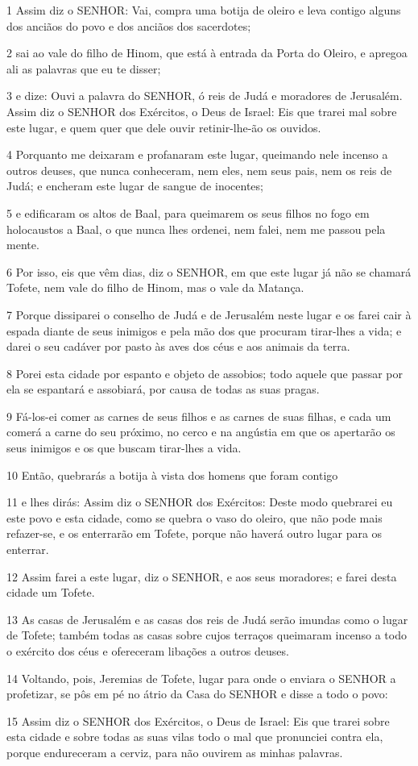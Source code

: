 \par 1 Assim diz o SENHOR: Vai, compra uma botija de oleiro e leva contigo alguns dos anciãos do povo e dos anciãos dos sacerdotes;
\par 2 sai ao vale do filho de Hinom, que está à entrada da Porta do Oleiro, e apregoa ali as palavras que eu te disser;
\par 3 e dize: Ouvi a palavra do SENHOR, ó reis de Judá e moradores de Jerusalém. Assim diz o SENHOR dos Exércitos, o Deus de Israel: Eis que trarei mal sobre este lugar, e quem quer que dele ouvir retinir-lhe-ão os ouvidos.
\par 4 Porquanto me deixaram e profanaram este lugar, queimando nele incenso a outros deuses, que nunca conheceram, nem eles, nem seus pais, nem os reis de Judá; e encheram este lugar de sangue de inocentes;
\par 5 e edificaram os altos de Baal, para queimarem os seus filhos no fogo em holocaustos a Baal, o que nunca lhes ordenei, nem falei, nem me passou pela mente.
\par 6 Por isso, eis que vêm dias, diz o SENHOR, em que este lugar já não se chamará Tofete, nem vale do filho de Hinom, mas o vale da Matança.
\par 7 Porque dissiparei o conselho de Judá e de Jerusalém neste lugar e os farei cair à espada diante de seus inimigos e pela mão dos que procuram tirar-lhes a vida; e darei o seu cadáver por pasto às aves dos céus e aos animais da terra.
\par 8 Porei esta cidade por espanto e objeto de assobios; todo aquele que passar por ela se espantará e assobiará, por causa de todas as suas pragas.
\par 9 Fá-los-ei comer as carnes de seus filhos e as carnes de suas filhas, e cada um comerá a carne do seu próximo, no cerco e na angústia em que os apertarão os seus inimigos e os que buscam tirar-lhes a vida.
\par 10 Então, quebrarás a botija à vista dos homens que foram contigo
\par 11 e lhes dirás: Assim diz o SENHOR dos Exércitos: Deste modo quebrarei eu este povo e esta cidade, como se quebra o vaso do oleiro, que não pode mais refazer-se, e os enterrarão em Tofete, porque não haverá outro lugar para os enterrar.
\par 12 Assim farei a este lugar, diz o SENHOR, e aos seus moradores; e farei desta cidade um Tofete.
\par 13 As casas de Jerusalém e as casas dos reis de Judá serão imundas como o lugar de Tofete; também todas as casas sobre cujos terraços queimaram incenso a todo o exército dos céus e ofereceram libações a outros deuses.
\par 14 Voltando, pois, Jeremias de Tofete, lugar para onde o enviara o SENHOR a profetizar, se pôs em pé no átrio da Casa do SENHOR e disse a todo o povo:
\par 15 Assim diz o SENHOR dos Exércitos, o Deus de Israel: Eis que trarei sobre esta cidade e sobre todas as suas vilas todo o mal que pronunciei contra ela, porque endureceram a cerviz, para não ouvirem as minhas palavras.

